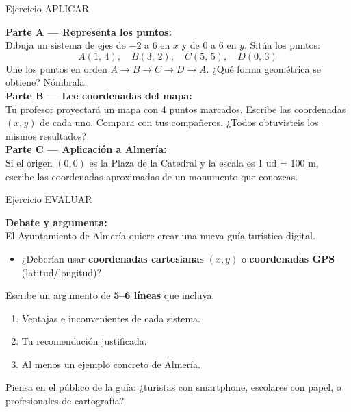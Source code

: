 \documentclass[aspectratio=169, 10pt, spanish]{beamer}
\begin{document}
\begin{frame}{Ejercicio APLICAR}
  \quad{}
  \vspace{4pt}
  \begin{aplicarbox}
    \AlmFontFootnote
    \textbf{Parte A — Representa los puntos:}\\
    Dibuja un sistema de ejes de $-2$ a $6$ en $x$
    y de $0$ a $6$ en $y$. Sitúa los puntos:
    \[
      A(1,\,4), \quad B(3,\,2), \quad C(5,\,5), \quad D(0,\,3)
    \]
    Une los puntos en orden $A \to B \to C \to D \to A$.
    ¿Qué forma geométrica se obtiene? Nómbrala.\\[6pt]
    \textbf{Parte B — Lee coordenadas del mapa:}\\
    Tu profesor proyectará un mapa con 4 puntos marcados.
    Escribe las coordenadas $(x, y)$ de cada uno.
    Compara con tus compañeros. ¿Todos obtuvisteis
    los mismos resultados?\\[6pt]
    \textbf{Parte C — Aplicación a Almería:}\\
    Si el origen $(0,0)$ es la Plaza de la Catedral y
    la escala es 1 ud = 100 m, escribe las coordenadas
    aproximadas de un monumento que conozcas.
  \end{aplicarbox}
\end{frame}

\begin{frame}{Ejercicio EVALUAR}
  \quad{}
  \vspace{4pt}
  \begin{evaluarbox}
    \AlmFontSmall
    \textbf{Debate y argumenta:}\\[6pt]
    El Ayuntamiento de Almería quiere crear una nueva
    guía turística digital.\\[4pt]
    \begin{itemize}
      \item ¿Deberían usar \textbf{coordenadas cartesianas}
            $(x, y)$ o \textbf{coordenadas GPS} (latitud/longitud)?
    \end{itemize}
    \vspace{6pt}
    Escribe un argumento de \textbf{5--6 líneas} que incluya:
    \begin{enumerate}
      \item Ventajas e inconvenientes de cada sistema.
      \item Tu recomendación justificada.
      \item Al menos un ejemplo concreto de Almería.
    \end{enumerate}
  \end{evaluarbox}
  \vspace{4pt}
  \begin{notabox}[Pista]
    \AlmFontFootnote
    Piensa en el público de la guía: ¿turistas con smartphone,
    escolares con papel, o profesionales de cartografía?
  \end{notabox}
\end{frame}
\end{document}
